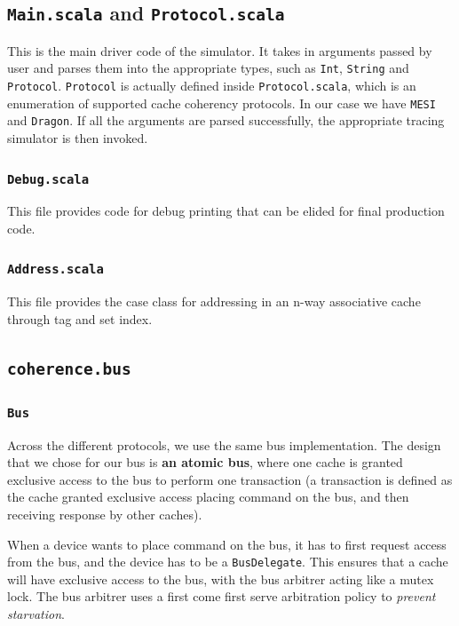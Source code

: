 \documentclass[nonacm,acmsmall,screen,11pt]{acmart}
\begin{document}
\subsection{\texttt{Main.scala} and \texttt{Protocol.scala}}
This is the main driver code of the simulator.
It takes in arguments passed by user and parses them into the appropriate types, such as \texttt{Int}, \texttt{String} and \texttt{Protocol}.
\texttt{Protocol} is actually defined inside \texttt{Protocol.scala}, which is an enumeration of supported cache coherency protocols.
In our case we have \texttt{MESI} and \texttt{Dragon}.
If all the arguments are parsed successfully, the appropriate tracing simulator is then invoked.

\subsubsection{\texttt{Debug.scala}}
This file provides code for debug printing that can be elided for final production code.

\subsubsection{\texttt{Address.scala}}
This file provides the case class for addressing in an n-way associative cache through tag and set index.

\subsection{\texttt{coherence.bus}}

\subsubsection{\texttt{Bus}}
Across the different protocols, we use the same bus implementation. The design that we chose for our bus is \textbf{an atomic bus}, where one cache is granted exclusive access to the bus to perform one transaction (a transaction is defined as the cache granted exclusive access placing command on the bus, and then receiving response by other caches).

When a device wants to place command on the bus, it has to first request access from the bus, and the device has to be a \texttt{BusDelegate}.
This ensures that a cache will have exclusive access to the bus, with the bus arbitrer acting like a mutex lock.
The bus arbitrer uses a first come first serve arbitration policy to \emph{prevent starvation}.
\end{document}
